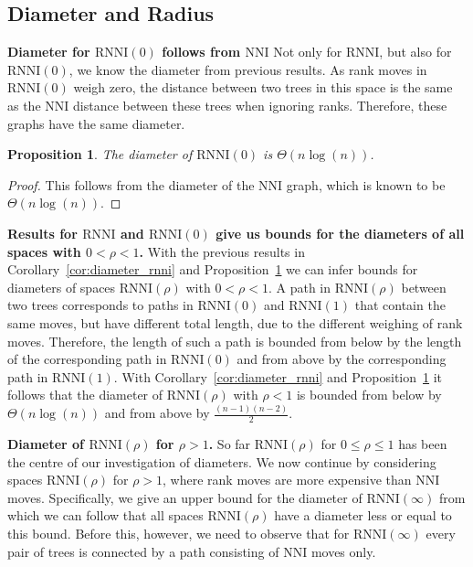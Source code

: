 \documentclass[11pt]{amsart}
\newtheorem{proposition}{Proposition}
\newcommand{\rnni}{\mathrm{RNNI}}
\newcommand{\nni}{\mathrm{NNI}}
\newcommand{\summary}[1]{\textbf{#1}} %
\begin{document}
\subsection{Diameter and Radius}

\summary{Diameter for $\rnni(0)$ follows from $\nni$}
Not only for $\rnni$, but also for $\rnni(0)$, we know the diameter from previous results.
As rank moves in $\rnni(0)$ weigh zero, the distance between two trees in this space is the same as the $\nni$ distance between these trees when ignoring ranks.
Therefore, these graphs have the same diameter.

\begin{proposition}
	The diameter of $\rnni(0)$ is $\Theta(n \log(n))$.
	\label{prop:diameter_nni}
\end{proposition}

\begin{proof}
	This follows from the diameter of the $\nni$ graph, which is known \autocite{Semple2003-nj} to be $\Theta(n \log(n))$.
\end{proof}

\summary{Results for $\rnni$ and $\rnni(0)$ give us bounds for the diameters of all spaces with $0 < \rho < 1$.}
With the previous results in Corollary~\ref{cor:diameter_rnni} and Proposition~\ref{prop:diameter_nni} we can infer bounds for diameters of spaces $\rnni(\rho)$ with $0 < \rho < 1$.
A path in $\rnni(\rho)$ between two trees corresponds to paths in $\rnni(0)$ and $\rnni(1)$ that contain the same moves, but have different total length, due to the different weighing of rank moves.
Therefore, the length of such a path is bounded from below by the length of the corresponding path in $\rnni(0)$ and from above by the corresponding path in $\rnni(1)$.
With Corollary~\ref{cor:diameter_rnni} and Proposition~\ref{prop:diameter_nni} it follows that the diameter of $\rnni(\rho)$ with $\rho < 1$ is bounded from below by $\Theta(n \log(n))$ and from above by $\frac{(n-1)(n-2)}{2}$.

\summary{Diameter of $\rnni(\rho)$ for $\rho > 1$.}
So far $\rnni(\rho)$ for $0 \leq \rho \leq 1$ has been the centre of our investigation of diameters.
We now continue by considering spaces $\rnni(\rho)$ for $\rho > 1$, where rank moves are more expensive than $\nni$ moves.
Specifically, we give an upper bound for the diameter of $\rnni(\infty)$ from which we can follow that all spaces $\rnni(\rho)$ have a diameter less or equal to this bound.
Before this, however, we need to observe that for $\rnni(\infty)$ every pair of trees is connected by a path consisting of $\nni$ moves only.
\end{document}

